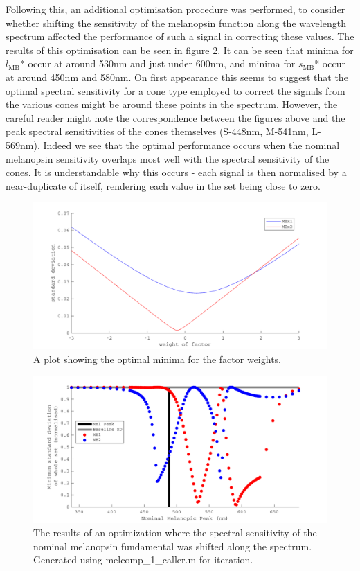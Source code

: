 Following this, an additional optimisation procedure was performed, to consider whether shifting the sensitivity of the melanopsin function along the wavelength spectrum affected the performance of such a signal in correcting these values. The results of this optimisation can be seen in figure \ref{fig:opt}. It can be seen that minima for $l_{\text{MB}}$* occur at around 530nm and just under 600nm, and minima for $s_{\text{MB}}$* occur at around 450nm and 580nm. On first appearance this seems to suggest that the optimal spectral sensitivity for a cone type employed to correct the signals from the various cones might be around these points in the spectrum. However, the careful reader might note the correspondence between the figures above and the peak spectral sensitivities of the cones themselves (S-448nm, M-541nm, L-569nm). Indeed we see that the optimal performance occurs when the nominal melanopsin sensitivity overlaps most well with the spectral sensitivity of the cones. It is understandable why this occurs - each signal is then normalised by a near-duplicate of itself, rendering each value in the set being close to zero.

\begin{figure}[htbp]
    \includegraphics[max width=\textwidth]{figs/comp/melcomp_1/minimiseSD.pdf}
    \caption{A plot showing the optimal minima for the factor weights.}
    \label{fig:minSD}
\end{figure} 

\begin{figure}[ht]
    \includegraphics[max width=\textwidth]{figs/comp/melcomp_1_caller/opt.pdf}
    \caption{The results of an optimization where the spectral sensitivity of the nominal melanopsin fundamental was shifted along the spectrum. Generated using melcomp\_1\_caller.m for iteration.}
    \label{fig:opt}
\end{figure} 

